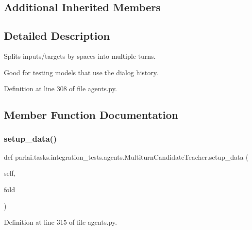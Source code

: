 \subsection*{Additional Inherited Members}


\subsection{Detailed Description}
\begin{DoxyVerb}Splits inputs/targets by spaces into multiple turns.

Good for testing models that use the dialog history.
\end{DoxyVerb}
 

Definition at line 308 of file agents.\+py.



\subsection{Member Function Documentation}
\mbox{\label{classparlai_1_1tasks_1_1integration__tests_1_1agents_1_1MultiturnCandidateTeacher_aed2bfff52c3db13cb2a0d2acf41fdb8f}} 
\subsubsection{\texorpdfstring{setup\+\_\+data()}{setup\_data()}}
{\footnotesize\ttfamily def parlai.\+tasks.\+integration\+\_\+tests.\+agents.\+Multiturn\+Candidate\+Teacher.\+setup\+\_\+data (\begin{DoxyParamCaption}\item[{}]{self,  }\item[{}]{fold }\end{DoxyParamCaption})}



Definition at line 315 of file agents.\+py.


